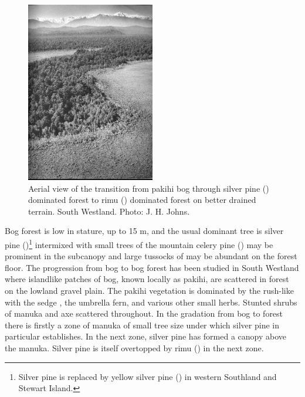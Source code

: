 \begin{figure}
	\includegraphics[width=0.5\textwidth]{graphics/figure68transition.jpg}
	\centering
	\caption[Aerial view of the transition from pakihi bog through silver pine to rimu]{Aerial view of the transition from pakihi bog through silver pine () dominated forest to rimu () dominated forest on better drained terrain.
South Westland.
	Photo: J. H. Johns.}
	\label{fig:68transition}
\end{figure}

Bog forest is low in stature, up to 15 m, and the usual dominant tree is silver pine ()\footnote{Silver pine is replaced by yellow silver pine () in western Southland and Stewart Island.} intermixed with small trees of the mountain celery pine () may be prominent in the subcanopy and large tussocks of  may be abundant on the forest floor.
The progression from bog to bog forest has been studied in South Westland where islandlike patches of bog, known locally as pakihi, are scattered in forest on the lowland gravel plain.
The pakihi vegetation is dominated by the rush-like  with the sedge , the umbrella fern,  and various other small herbs.
Stunted shrubs of manuka and  axe scattered throughout.
In the gradation from bog to forest there is firstly a zone of manuka of small tree size under which silver pine in particular establishes.
In the next zone, silver pine has formed a canopy above the manuka.
Silver pine is itself overtopped by rimu () in the next zone.


